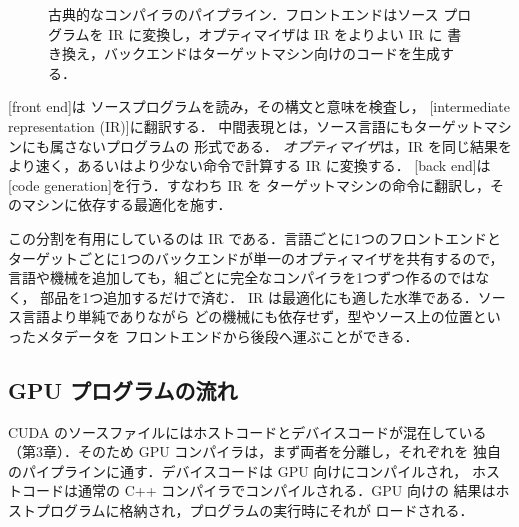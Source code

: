 \documentclass[../main.tex]{subfiles}
\begin{document}
\begin{figure}[tb]
  \centering
  
  \caption{古典的なコンパイラのパイプライン．フロントエンドはソース
    プログラムを IR に変換し，オプティマイザは IR をよりよい IR に
    書き換え，バックエンドはターゲットマシン向けのコードを生成する．}
  \label{fig:l10-compile-flow}
\end{figure}

\begin{definition}
  [front end]は
  ソースプログラムを読み，その構文と意味を検査し，
  [intermediate representation (IR)]に翻訳する．
  中間表現とは，ソース言語にもターゲットマシンにも属さないプログラムの
  形式である．%
  \emph{オプティマイザ}は，IR を同じ結果を
  より速く，あるいはより少ない命令で計算する IR に変換する．
  [back end]は
  [code generation]を行う．すなわち IR を
  ターゲットマシンの命令に翻訳し，そのマシンに依存する最適化を施す．
\end{definition}

この分割を有用にしているのは IR である．言語ごとに1つのフロントエンドと
ターゲットごとに1つのバックエンドが単一のオプティマイザを共有するので，
言語や機械を追加しても，組ごとに完全なコンパイラを1つずつ作るのではなく，
部品を1つ追加するだけで済む．
IR は最適化にも適した水準である．ソース言語より単純でありながら
どの機械にも依存せず，型やソース上の位置といったメタデータを
フロントエンドから後段へ運ぶことができる．

\subsection{GPU プログラムの流れ}

CUDA のソースファイルにはホストコードとデバイスコードが混在している
（第3章）．そのため GPU コンパイラは，まず両者を分離し，それぞれを
独自のパイプラインに通す．デバイスコードは GPU 向けにコンパイルされ，
ホストコードは通常の C++ コンパイラでコンパイルされる．GPU 向けの
結果はホストプログラムに格納され，プログラムの実行時にそれが
ロードされる．
\end{document}
